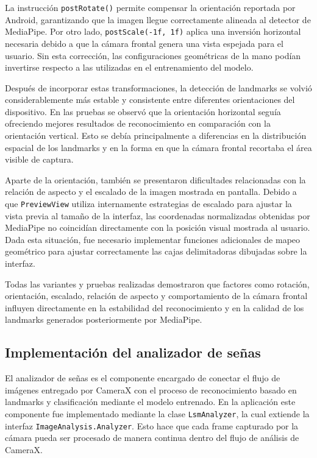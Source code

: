 	La instrucción \texttt{postRotate()} permite compensar la orientación reportada por Android, garantizando que la imagen llegue correctamente alineada al detector de MediaPipe. Por otro lado, \texttt{postScale(-1f, 1f)} aplica una inversión horizontal necesaria debido a que la cámara frontal genera una vista espejada para el usuario. Sin esta corrección, las configuraciones geométricas de la mano podían invertirse respecto a las utilizadas en el entrenamiento del modelo.
	
	Después de incorporar estas transformaciones, la detección de landmarks se volvió considerablemente más estable y consistente entre diferentes orientaciones del dispositivo. En las pruebas se observó que la orientación horizontal seguía ofreciendo mejores resultados de reconocimiento en comparación con la orientación vertical. Esto se debía principalmente a diferencias en la distribución espacial de los landmarks y en la forma en que la cámara frontal recortaba el área visible de captura.
	
	Aparte de la orientación, también se presentaron dificultades relacionadas con la relación de aspecto y el escalado de la imagen mostrada en pantalla. Debido a que \texttt{PreviewView} utiliza internamente estrategias de escalado para ajustar la vista previa al tamaño de la interfaz, las coordenadas normalizadas obtenidas por MediaPipe no coincidían directamente con la posición visual mostrada al usuario. Dada esta situación, fue necesario implementar funciones adicionales de mapeo geométrico para ajustar correctamente las cajas delimitadoras dibujadas sobre la interfaz.
	
	Todas las variantes y pruebas realizadas demostraron que factores como rotación, orientación, escalado, relación de aspecto y comportamiento de la cámara frontal influyen directamente en la estabilidad del reconocimiento y en la calidad de los landmarks generados posteriormente por MediaPipe.

	
	\subsection{Implementación del analizador de señas}
	
	El analizador de señas es el componente encargado de conectar el flujo de imágenes entregado por CameraX con el proceso de reconocimiento basado en landmarks y clasificación mediante el modelo entrenado. En la aplicación este componente fue implementado mediante la clase \texttt{LsmAnalyzer}, la cual extiende la interfaz \texttt{ImageAnalysis.Analyzer}. Esto hace que cada frame capturado por la cámara pueda ser procesado de manera continua dentro del flujo de análisis de CameraX.
	
